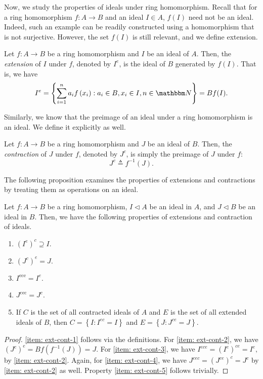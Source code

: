 Now, we study the properties of ideals under ring homomorphism. Recall that for a ring homomorphism $f: A \rightarrow B$ and an ideal $I \in A$, $f(I)$ need not be an ideal. Indeed, such an example can be readily constructed using a homomorphism that is not surjective. However, the set $f(I)$ is still relevant, and we define extension.
\begin{definition}[Extension]
    Let $f: A \rightarrow B$ be a ring homomorphism and $I$ be an ideal of $A$. Then, the {\it extension} of $I$ under $f$, denoted by $I^e$, is the ideal of $B$ generated by $f(I)$. That is, we have
    \[
    I^{e}=\left\{\sum_{i=1}^{n} a_{i} f\left(x_{i}\right): a_{i} \in B, x_{i} \in I, n \in {\N}\right\} = Bf(I).
    \]
\end{definition}
Similarly, we know that the preimage of an ideal under a ring homomorphism is an ideal. We define it explicitly as well.
\begin{definition}[Contraction]
    Let $f: A \rightarrow B$ be a ring homomorphism and $J$ be an ideal of $B$. Then, the {\it contraction} of $J$ under $f$, denoted by $J^c$, is simply the preimage of $J$ under $f$: 
    \[J^c\triangleq f^{-1}(J).\]
\end{definition}
The following proposition examines the properties of extensions and contractions by treating them as operations on an ideal.
\begin{proposition}\label{prop: ext-cont-ideal}
Let $f: A\to B$ be a ring homomorphism, $I \lhd A$ be an ideal in $A$, and $J \lhd B$ be an ideal in $B$. Then, we have the following properties of extensions and contraction of ideals.
    \begin{enumerate}
        \item \label{item: ext-cont-1}$\left(I^{e}\right)^{c} \supseteq I$.
        \item \label{item: ext-cont-2}$\left(J^{c}\right)^{e} = J$.
        \item \label{item: ext-cont-3}$I^{\text {ece}}=I^{e}$.
        \item \label{item: ext-cont-4}$J^{\text {cec}}=J^{c}$.
        \item \label{item: ext-cont-5}If $C$ is the set of all contracted ideals of $A$ and $E$ is the set of all extended ideals of $B$, then $C=\left\{I: I^{e c}=I\right\}$ and $E=\left\{J: J^{c e}=J\right\}$.
    \end{enumerate}
\end{proposition}
\begin{proof}
    \eqref{item: ext-cont-1} follows via the definitions. For \eqref{item: ext-cont-2}, we have  $\left(J^{c}\right)^{e} = Bf(f^{-1}(J)) = J$.  For \eqref{item: ext-cont-3}, we have
    \(I^{e c e}=\left(I^{e}\right)^{c e} = I^{e},\)
    by \eqref{item: ext-cont-2}. 
    Again, for \eqref{item: ext-cont-4}, we have
    \(J^{{cec}}= (J^{ce})^c = J^{c}\) by \eqref{item: ext-cont-2} as well. Property \eqref{item: ext-cont-5} follows trivially.
\end{proof}

